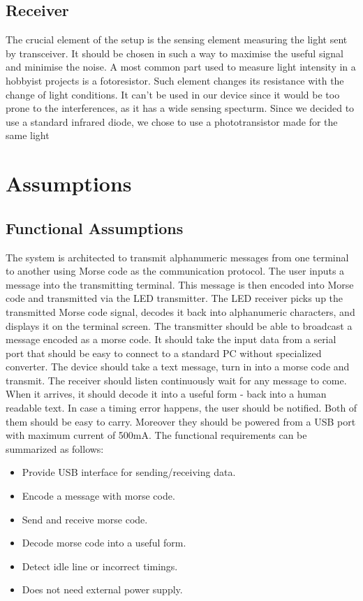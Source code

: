 \documentclass[12pt]{article}
\begin{document}
  \subsection{Receiver}
  The crucial element of the setup is the sensing element measuring the light sent by transceiver.
  It should be chosen in such a way to maximise the useful signal and minimise the noise.
  A most common part used to measure light intensity in a hobbyist projects is a fotoresistor. Such element changes its resistance with the change of light conditions. 
  It can't be used in our device since it would be too prone to the interferences, as it has a wide sensing specturm.
  Since we decided to use a standard infrared diode, we chose to use a phototransistor made for the same light 
	
	\section{Assumptions}
	\subsection{Functional Assumptions}
  The system is architected to transmit alphanumeric messages from one terminal to another using Morse code as the communication protocol. The user inputs a message into the transmitting terminal. This message is then encoded into Morse code and 
  transmitted via the LED transmitter. The LED receiver picks up the transmitted Morse code signal, decodes it back into alphanumeric characters, and displays it on the terminal screen.
  The transmitter should be able to broadcast a message encoded as a morse code. It should take the input data from a serial port that should be easy to connect to a standard PC without specialized converter.
  The device should take a text message, turn in into a morse code and transmit.
  The receiver should listen continuously wait for any message to come. When it arrives, it should decode it into a useful form - back into a human readable text. In case a timing error happens, the user should be notified.
  Both of them should be easy to carry. Moreover they should be powered from a USB port with maximum current of 500mA.
  The functional requirements can be summarized as follows:
  \begin{itemize}
    \item Provide USB interface for sending/receiving data.
    \item Encode a message with morse code.
    \item Send and receive morse code.
    \item Decode morse code into a useful form.
    \item Detect idle line or incorrect timings.
    \item Does not need external power supply.
  \end{itemize}
\end{document}
